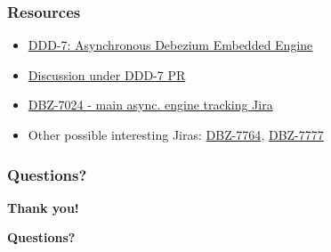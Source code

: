 \documentclass[10pt,utf8]{beamer}
\begin{document}
\begin{frame}
    \frametitle{Resources}
    \begin{itemize}
        \color{blue}
        \item \href{https://github.com/debezium/debezium-design-documents/blob/main/DDD-7.md}{DDD-7: Asynchronous Debezium Embedded Engine}
        \item \href{https://github.com/debezium/debezium-design-documents/pull/8}{Discussion under DDD-7 PR}
        \item \href{https://issues.redhat.com/browse/DBZ-7024}{DBZ-7024 - main async. engine tracking Jira}
        \item \color{black}Other possible interesting Jiras:\color{blue} \href{https://issues.redhat.com/browse/DBZ-7764}{DBZ-7764}, \href{https://issues.redhat.com/browse/DBZ-7777}{DBZ-7777}
        \color{black}
    \end{itemize}
\end{frame}

\begin{frame}
    \frametitle{Questions?}
    \centering
     \textbf{\Huge{Thank you!}}
    
    \vspace{1.5cm}
    
    \textbf{\Huge{Questions?}}
    
    \vspace{1cm}
\end{frame}


\end{document}
